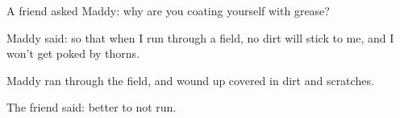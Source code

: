 A friend asked Maddy: why are you coating yourself with grease?

Maddy said: so that when I run through a field, no dirt will stick to me, and I won't get poked by thorns.

Maddy ran through the field, and wound up covered in dirt and scratches.

The friend said: better to not run.
